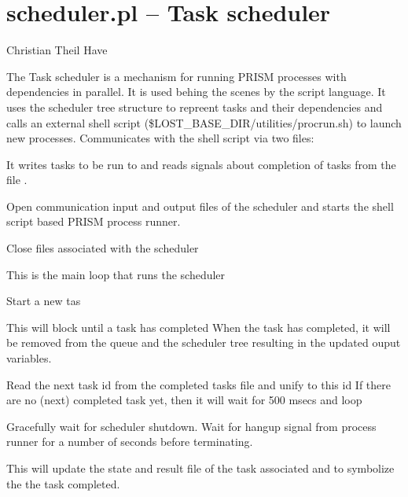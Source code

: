 


\section{scheduler.pl -- Task scheduler}

\label{sec:scheduler}

\begin{tags}
Christian Theil Have
\end{tags}

The Task scheduler is a mechanism for running PRISM processes with dependencies in parallel.
It is used behing the scenes by the script language.
It uses the scheduler tree structure to repreent tasks and their dependencies and
calls an external shell script (\$LOST_BASE_DIR/utilities/procrun.sh) to launch new processes.
Communicates with the shell script via two files:

It writes tasks to be run to  and reads signals about completion
of tasks from the file .\vspace{0.7cm}

\begin{description}
Open communication input and output files of the scheduler and starts
the shell script based PRISM process runner.

Close files associated with the scheduler

This is the main loop that runs the scheduler

Start a new tas

This will block until a task has completed
When the task has completed, it will be removed from the queue and the scheduler tree
resulting in the updated ouput variables.

Read the next task id from the completed tasks file and unify  to this id
If there are no (next) completed task yet, then it will wait for 500 msecs and loop

Gracefully wait for scheduler shutdown. Wait for hangup signal from process runner for a number of seconds
before terminating.

This will update the state and result file of the task associated  and 
to symbolize the the task completed.
\end{description}

